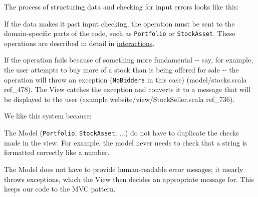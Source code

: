 \documentclass[a4]{article}
\begin{document}
The process of structuring data and checking for input errors looks like this:
\begin{figure}
\noindent{}
\end{figure}

If the data makes it past input checking, the operation must be sent to the
domain-specific parts of the code, such as \texttt{Portfolio} or \texttt{StockAsset}.
These operations are described in detail in \hyperref[interactions]{interactions}.

If the operation fails because of something more fundamental -{}- say, for
example, the user attempts to buy more of a stock than is being offered for
sale -{}- the operation will throw an exception (\texttt{NoBidders} in this case)
(model/stocks.scala ref\_478). The View catches the exception and converts it to
a message that will be displayed to the user (example
website/view/StockSeller.scala ref\_736).

We like this system because:
\setcounter{listcnt0}{0}
\begin{list}{.}
{
\setlength{\rightmargin}{\leftmargin}
}

\item The Model (\texttt{Portfolio}, \texttt{StockAsset}, ...) do not have to duplicate the
checks made in the view. For example, the model never needs to check that a
string is formatted correctly like a number.

\item The Model does not have to provide human-readable error mesages; it mearly
throws exceptions, which the View then decides an appropriate message for.
This keeps our code to the MVC pattern.
\end{list}
\end{document}
